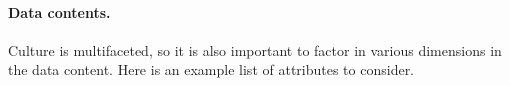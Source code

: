 \documentclass{article} %
\begin{document}

\paragraph{Data contents.} Culture is multifaceted, so it is also important to factor in various dimensions in the data content. Here is an example list of attributes to consider. 
\end{document}
